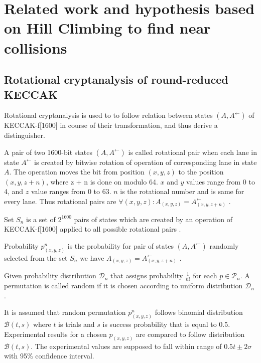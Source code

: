 \chapter{Related work and hypothesis based on Hill Climbing to find near collisions}

\section{Rotational cryptanalysis of round-reduced KECCAK}

Rotational cryptanalysis\cite{00041} is used to to follow relation between states $(A, A^{\leftarrow})$ of 
KECCAK-f[1600] in course of their transformation, and thus derive a distinguisher.

\begin{defn}
A pair of two 1600-bit states $(A, A^{\leftarrow})$ is called rotational pair when each lane in state $A^{\leftarrow}$
is created by bitwise rotation of operation of corresponding lane in state $A$. The operation moves the bit from 
position $(x, y, z)$ to the position $(x, y, z + n)$, where z + n is done on modulo 64. $x$ and $y$ values range from 0 
to 4, and $z$ value ranges from 0 to 63. $n$ is the rotational number and is same for every lane. Thus rotational pairs
are $\forall(x, y, z) : A_{(x, y, z)} = A^{\leftarrow}_{(x, y, z + n)}$ \cite{00022}.
\end{defn}

\begin{defn}
Set $S_n$ is a set of $2^{1600}$ pairs of states which are created by an operation of KECCAK-f[1600] applied to all
possible rotational pairs \cite{00022}.
\end{defn}

\begin{defn}
Probability $p^{n}_{(x, y, z)}$ is the probability for pair of states $(A, A^{\leftarrow})$ randomly selected from the
set $S_n$ we have $A_{(x, y, z)} = A^{\leftarrow}_{(x, y, z + n)}$ \cite{00022}.
\end{defn}

\begin{defn}
Given probability distribution $\mathcal{D}_n$ that assigns probability $\frac{1}{n!}$ for each $p \in \mathcal{P}_n$.
A permutation is called random if it is chosen according to uniform distribution $\mathcal{D}_n$ \cite{00022}.
\end{defn}

It is assumed that random permutation $p^n_{(x, y, z)}$ follows binomial distribution $\mathcal{B}(t, s)$ where $t$ is
trials and $s$ is success probability that is equal to 0.5. Experimental results for a chosen $p_{(x, y, z)}$ are 
compared to follow distribution $\mathcal{B}(t, s)$. The experimental values are supposed to fall within range of 
$0.5t\pm2\sigma$ with 95\% confidence interval.

